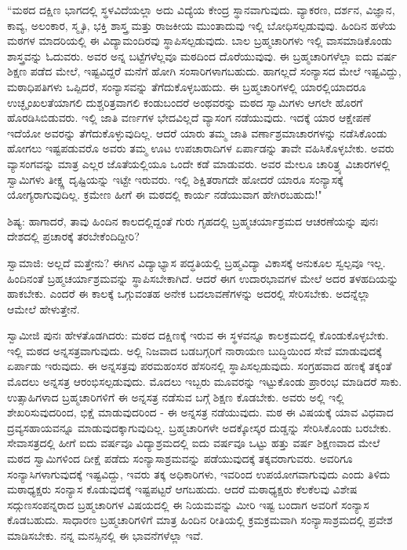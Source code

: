 “ಮಠದ ದಕ್ಷಿಣ ಭಾಗದಲ್ಲಿ ಸ್ಥಳವಿದೆಯಲ್ಲಾ ಅದು ವಿದ್ಯೆಯ ಕೇಂದ್ರ ಸ್ಥಾನವಾಗುವುದು. ವ್ಯಾಕರಣ, ದರ್ಶನ, ವಿಜ್ಞಾನ, ಕಾವ್ಯ, ಅಲಂಕಾರ, ಸ್ಮೃತಿ, ಭಕ್ತಿ ಶಾಸ್ತ್ರ ಮತ್ತು ರಾಜಕೀಯ ಮುಂತಾದುವು ಇಲ್ಲಿ ಬೋಧಿಸಲ್ಪಡುವುವು. ಹಿಂದಿನ ಹಳೆಯ ಮಠಗಳ ಮಾದರಿಯಲ್ಲಿ ಈ ವಿದ್ಯಾಮಂದಿರವು ಸ್ಥಾಪಿಸಲ್ಪಡುವುದು. ಬಾಲ ಬ್ರಹ್ಮಚಾರಿಗಳು ಇಲ್ಲಿ ವಾಸಮಾಡಿಕೊಂಡು ಶಾಸ್ತ್ರವನ್ನು ಓದುವರು. ಅವರ ಅನ್ನ ಬಟ್ಟೆಗಳೆಲ್ಲವೂ ಮಠದಿಂದ ದೊರೆಯುವುವು. ಈ ಬ್ರಹ್ಮಚಾರಿಗಳೆಲ್ಲಾ ಐದು ವರ್ಷ ಶಿಕ್ಷಣ ಪಡೆದ ಮೇಲೆ, ಇಷ್ಟವಿದ್ದರೆ ಮನೆಗೆ ಹೋಗಿ ಸಂಸಾರಿಗಳಾಗಬಹುದು. ಹಾಗಲ್ಲದೆ ಸಂನ್ಯಾಸದ ಮೇಲೆ ಇಷ್ಟವಿದ್ದು, ಮಠಾಧಿಪತಿಗಳು ಒಪ್ಪಿದರೆ, ಸಂನ್ಯಾಸವನ್ನು ತೆಗೆದುಕೊಳ್ಳಬಹುದು. ಈ ಬ್ರಹ್ಮಚಾರಿಗಳಲ್ಲಿ ಯಾರಲ್ಲಿಯಾದರೂ ಉಚ್ಛೃಂಖಲತೆಯಾಗಲಿ ದುಶ್ಚರಿತ್ರವಾಗಲಿ ಕಂಡುಬಂದರೆ ಅಂಥವರನ್ನು ಮಠದ ಸ್ವಾಮಿಗಳು ಆಗಲೇ ಹೊರಗೆ ಹೊರಡಿಸಿಬಿಡುವರು. ಇಲ್ಲಿ ಜಾತಿ ವರ್ಣಗಳ ಭೇದವಿಲ್ಲದೆ ವ್ಯಾಸಂಗ ನಡೆಯುವುದು. ಇದಕ್ಕೆ ಯಾರ ಆಕ್ಷೇಪಣೆ ಇದೆಯೋ ಅವರನ್ನು ತೆಗೆದುಕೊಳ್ಳುವುದಿಲ್ಲ. ಆದರೆ ಯಾರು ತಮ್ಮ ಜಾತಿ ವರ್ಣಾಶ್ರಮಾಚಾರಗಳನ್ನು ನಡೆಸಿಕೊಂಡು ಹೋಗಲು ಇಷ್ಟಪಡುವರೊ ಅವರು ತಮ್ಮ ಊಟ ಉಪಚಾರಾದಿಗಳ ಏರ್ಪಾಡನ್ನು ತಾವೇ ವಹಿಸಿಕೊಳ್ಳಬೇಕು. ಅವರು ವ್ಯಾಸಂಗವನ್ನು ಮಾತ್ರ ಎಲ್ಲರ ಜೊತೆಯಲ್ಲಿಯೂ ಒಂದೇ ಕಡೆ ಮಾಡುವರು. ಅವರ ಮೇಲೂ ಚಾರಿತ್ರ್ಯ ವಿಚಾರಗಳಲ್ಲಿ ಸ್ವಾಮಿಗಳು ತೀಕ್ಷ್ಣ ದೃಷ್ಟಿಯನ್ನು ಇಟ್ಟೇ ಇರುವರು. ಇಲ್ಲಿ ಶಿಕ್ಷಿತರಾಗದೇ ಹೋದರೆ ಯಾರೂ ಸಂನ್ಯಾಸಕ್ಕೆ ಯೋಗ್ಯರಾಗುವುದಿಲ್ಲ. ಕ್ರಮೇಣ ಹೀಗೆ ಈ ಮಠದಲ್ಲಿ ಕಾರ್ಯ ನಡೆಯುವಾಗ ಹೇಗಿರಬಹುದು!"

ಶಿಷ್ಯ: ಹಾಗಾದರೆ, ತಾವು ಹಿಂದಿನ ಕಾಲದಲ್ಲಿದ್ದಂತೆ ಗುರು ಗೃಹದಲ್ಲಿ ಬ್ರಹ್ಮಚರ್ಯಾಶ್ರಮದ ಆಚರಣೆಯನ್ನು ಪುನಃ ದೇಶದಲ್ಲಿ ಪ್ರಚಾರಕ್ಕೆ ತರಬೇಕೆಂದಿದ್ದೀರಿ?

ಸ್ವಾಮಾಜಿ: ಅಲ್ಲದೆ ಮತ್ತೇನು? ಈಗಿನ ವಿದ್ಯಾಭ್ಯಾಸ ಪದ್ಧತಿಯಲ್ಲಿ ಬ್ರಹ್ಮವಿದ್ಯಾ ವಿಕಾಸಕ್ಕೆ ಅನುಕೂಲ ಸ್ವಲ್ಪವೂ ಇಲ್ಲ. ಹಿಂದಿನಂತೆ ಬ್ರಹ್ಮಚರ್ಯಾಶ್ರಮವನ್ನು ಸ್ಥಾಪಿಸಬೇಕಾಗಿದೆ. ಆದರೆ ಈಗ ಉದಾರಭಾವಗಳ ಮೇಲೆ ಅದರ ತಳಹದಿಯನ್ನು ಹಾಕಬೇಕು. ಎಂದರೆ ಈ ಕಾಲಕ್ಕೆ ಒಗ್ಗುವಂತಹ ಅನೇಕ ಬದಲಾವಣೆಗಳನ್ನು ಅದರಲ್ಲಿ ಸೇರಿಸಬೇಕು. ಅದನ್ನೆಲ್ಲಾ ಆಮೇಲೆ ಹೇಳುತ್ತೇನೆ.

ಸ್ವಾಮೀಜಿ ಪುನಃ ಹೇಳತೊಡಗಿದರು: ಮಠದ ದಕ್ಷಿಣಕ್ಕೆ ಇರುವ ಈ ಸ್ಥಳವನ್ನೂ ಕಾಲಕ್ರಮದಲ್ಲಿ ಕೊಂಡುಕೊಳ್ಳಬೇಕು. ಇಲ್ಲಿ ಮಠದ ಅನ್ನಸತ್ರವಾಗುವುದು. ಅಲ್ಲಿ ನಿಜವಾದ ಬಡಬಗ್ಗರಿಗೆ ನಾರಾಯಣ ಬುದ್ಧಿಯಿಂದ ಸೇವೆ ಮಾಡುವುದಕ್ಕೆ ಏರ್ಪಾಡು ಇರುವುದು. ಈ ಅನ್ನಸತ್ರವು ಪರಮಹಂಸರ ಹೆಸರಿನಲ್ಲಿ ಸ್ಥಾಪಿಸಲ್ಪಡುವುದು. ಸಂಗ್ರಹವಾದ ಹಣಕ್ಕೆ ತಕ್ಕಂತೆ ಮೊದಲು ಅನ್ನಸತ್ರ ಆರಂಭಿಸಲ್ಪಡುವುದು. ಮೊದಲು ಇಬ್ಬರು ಮೂವರನ್ನು ಇಟ್ಟುಕೊಂಡು ಪ್ರಾರಂಭ ಮಾಡಿದರೆ ಸಾಕು. ಉತ್ಸಾಹಿಗಳಾದ ಬ್ರಹ್ಮಚಾರಿಗಳಿಗೆ ಈ ಅನ್ನಸತ್ರ ನಡೆಸುವ ಬಗ್ಗೆ ಶಿಕ್ಷಣ ಕೊಡಬೇಕು. ಅವರು ಅಲ್ಲಿ ಇಲ್ಲಿ ಶೇಖರಿಸುವುದರಿಂದ, ಭಿಕ್ಷೆ ಮಾಡುವುದರಿಂದ - ಈ ಅನ್ನಸತ್ರ ನಡೆಯುವುದು. ಮಠ ಈ ವಿಷಯಕ್ಕೆ ಯಾವ ವಿಧವಾದ ದ್ರವ್ಯಸಹಾಯವನ್ನೂ ಮಾಡುವುದಕ್ಕಾಗುವುದಿಲ್ಲ. ಬ್ರಹ್ಮಚಾರಿಗಳೇ ಅದಕ್ಕೋಸ್ಕರ ದುಡ್ಡನ್ನು ಸೇರಿಸಿಕೊಂಡು ಬರಬೇಕು. ಸೇವಾಸತ್ರದಲ್ಲಿ ಹೀಗೆ ಐದು ವರ್ಷವೂ ವಿದ್ಯಾಶ್ರಮದಲ್ಲಿ ಐದು ವರ್ಷವೂ ಒಟ್ಟು ಹತ್ತು ವರ್ಷ ಶಿಕ್ಷಣವಾದ ಮೇಲೆ ಮಠದ ಸ್ವಾಮಿಗಳಿಂದ ದೀಕ್ಷೆ ಪಡೆದು ಸಂನ್ಯಾಸಾಶ್ರಮವನ್ನು ಪಡೆಯುವುದಕ್ಕೆ ತಕ್ಕವರಾಗುವರು. ಅವರಿಗೂ ಸಂನ್ಯಾಸಿಗಳಾಗುವುದಕ್ಕೆ ಇಷ್ಟವಿದ್ದು, ಇವರು ತಕ್ಕ ಅಧಿಕಾರಿಗಳು, ಇವರಿಂದ ಉಪಯೋಗವಾಗುವುದು ಎಂದು ತಿಳಿದು ಮಠಾಧ್ಯಕ್ಷರು ಸಂನ್ಯಾಸ ಕೊಡುವುದಕ್ಕೆ ಇಷ್ಟಪಟ್ಟರೆ ಆಗಬಹುದು. ಆದರೆ ಮಠಾಧ್ಯಕ್ಷರು ಕೆಲಕೆಲವು ವಿಶೇಷ ಸದ್ಗುಣಸಂಪನ್ನರಾದ ಬ್ರಹ್ಮಚಾರಿಗಳ ವಿಷಯದಲ್ಲಿ ಈ ನಿಯಮವನ್ನು ಮೀರಿ ಇಷ್ಟ ಬಂದಾಗ ಅವರಿಗೆ ಸಂನ್ಯಾಸ ಕೊಡಬಹುದು. ಸಾಧಾರಣ ಬ್ರಹ್ಮಚಾರಿಗಳಿಗೆ ಮಾತ್ರ ಹಿಂದಿನ ರೀತಿಯಲ್ಲಿ ಕ್ರಮಕ್ರಮವಾಗಿ ಸಂನ್ಯಾಸಾಶ್ರಮದಲ್ಲಿ ಪ್ರವೇಶ ಮಾಡಿಸಬೇಕು. ನನ್ನ ಮನಸ್ಸಿನಲ್ಲಿ ಈ ಭಾವನೆಗಳೆಲ್ಲಾ ಇವೆ.

